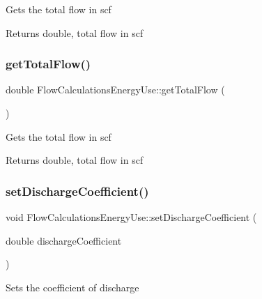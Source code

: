 Gets the total flow in scf

\begin{DoxyReturn}{Returns}
double, total flow in scf 
\end{DoxyReturn}
\mbox{\label{class_flow_calculations_energy_use_a154ce8f8307b443366b99719987dd725}} 
\subsubsection{\texorpdfstring{get\+Total\+Flow()}{getTotalFlow()}\hspace{0.1cm}{\footnotesize\ttfamily [3/3]}}
{\footnotesize\ttfamily double Flow\+Calculations\+Energy\+Use\+::get\+Total\+Flow (\begin{DoxyParamCaption}{ }\end{DoxyParamCaption})}

Gets the total flow in scf

\begin{DoxyReturn}{Returns}
double, total flow in scf 
\end{DoxyReturn}
\mbox{\label{class_flow_calculations_energy_use_aaa0b642f4cb22b3b74acd8a5d473a107}} 
\subsubsection{\texorpdfstring{set\+Discharge\+Coefficient()}{setDischargeCoefficient()}\hspace{0.1cm}{\footnotesize\ttfamily [1/3]}}
{\footnotesize\ttfamily void Flow\+Calculations\+Energy\+Use\+::set\+Discharge\+Coefficient (\begin{DoxyParamCaption}\item[{double}]{discharge\+Coefficient }\end{DoxyParamCaption})\hspace{0.3cm}{\ttfamily [inline]}}

Sets the coefficient of discharge


